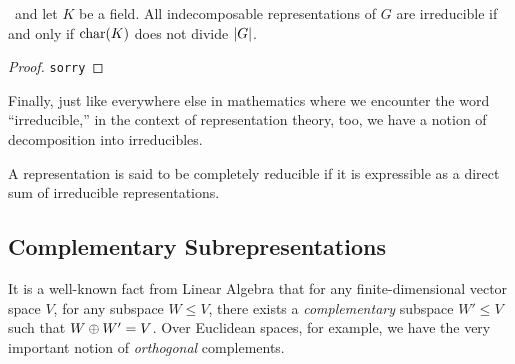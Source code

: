 \begin{proposition}
    \ and let $K$ be a field. All indecomposable representations of $G$ are irreducible if and only if $\operatorname{char}\!\left( K \right)$ does not divide $\left\lvert G \right\rvert$.
\end{proposition}
\begin{proof}
    \verb|sorry|
\end{proof}

Finally, just like everywhere else in mathematics where we encounter the word ``irreducible,'' in the context of representation theory, too, we have a notion of decomposition into irreducibles.

\begin{boxdefinition} \label{Ch1:Def:Comp_Red}
    A representation is said to be completely reducible if it is expressible as a direct sum of irreducible representations.
\end{boxdefinition}

\subsection{Complementary Subrepresentations}

It is a well-known fact from Linear Algebra that for any finite-dimensional vector space $V$, for any subspace $W \leq V$, there exists a \textit{complementary} subspace $W' \leq V$ such that $W \oplus W' = V$. Over Euclidean spaces, for example, we have the very important notion of \textit{orthogonal} complements.

